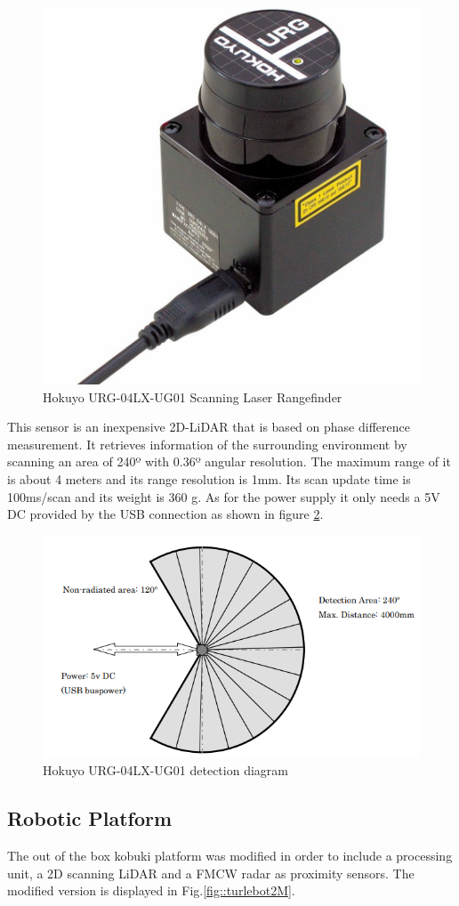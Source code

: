 \begin{figure}[h] 
\centerline{\includegraphics [width=0.5 \textwidth]{imgs/chapter4/lidar.jpg}}
\caption{Hokuyo URG-04LX-UG01 Scanning Laser Rangefinder}
\label{fig:lidar}
\end{figure}

This sensor is an inexpensive 2D-\ac{LiDAR} that is based on phase difference measurement. It retrieves information of the surrounding environment by scanning an area of 240º with 0.36º angular resolution. The maximum range of it is about 4 meters and its range resolution is 1mm. Its scan update time is 100ms/scan and its weight is 360 g.  As for the power supply it only needs a 5V DC provided by the USB connection as shown in figure \ref{fig:lidarS}.



\begin{figure}[h] 
\centerline{\includegraphics [width=0.6 \textwidth]{imgs/chapter4/lidarS.png}}
\caption{Hokuyo URG-04LX-UG01 detection diagram}
\label{fig:lidarS}
\end{figure}

\subsection{Robotic Platform}
The out of the box kobuki platform was modified in order to include a processing unit, a 2D scanning \ac{LiDAR} and a \ac{FMCW} radar as proximity sensors. The modified version is displayed in Fig.\ref{fig::turlebot2M}. 

